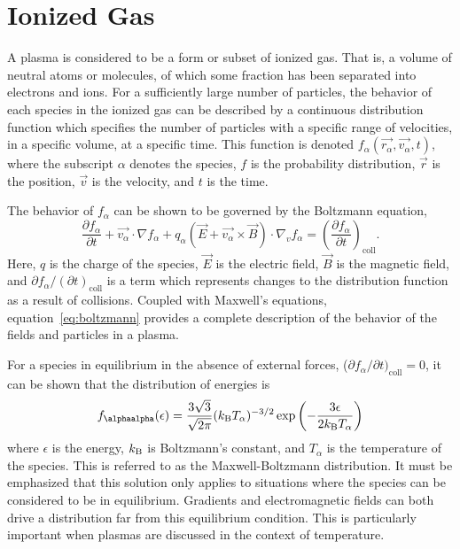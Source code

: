 \section{Ionized Gas}
A plasma is considered to be a form or subset of ionized gas. That is, a volume
of neutral atoms or molecules, of which some fraction has been separated into
electrons and ions. For a sufficiently large number of particles, the behavior
of each species in the ionized gas can be described by a continuous distribution
function which specifies the number of particles with a specific range of
velocities, in a specific volume, at a specific time. This function is denoted
$f_\alpha(\vec{r_\alpha}, \vec{v_\alpha}, t)$, where the subscript $\alpha$
denotes the species, $f$ is the probability distribution, $\vec{r}$ is the
position, $\vec{v}$ is the velocity, and $t$ is the time.

The behavior of $f_\alpha$ can be shown to be governed by the Boltzmann
equation,
\begin{equation}\label{eq:boltzmann}
  \frac{\partial f_\alpha}{\partial t} + \vec{v_\alpha}\cdot\nabla f_\alpha +
  q_\alpha \left(\vec{E} + \vec{v_\alpha}\times\vec{B}\right)
  \cdot \nabla_v f_\alpha = \left( \frac{\partial f_\alpha}
  {\partial t}\right)_\mathrm{coll}.
\end{equation}
Here, $q$ is the charge of the species, $\vec{E}$ is the electric field,
$\vec{B}$ is the magnetic field, and $\partial f_\alpha/(\partial
t)_\mathrm{coll}$ is a term which represents changes to the distribution
function as a result of collisions. Coupled with Maxwell's equations,
equation~\ref{eq:boltzmann} provides a complete description of the behavior of
the fields and particles in a plasma.

For a species in equilibrium in the absence of external forces, ($\partial
f_\alpha/\partial t)_\mathrm{coll} = 0$, it can be shown that the distribution
of energies is
\begin{equation}\label{eq:mb}
  f_{\alphaalpha}(\epsilon) = \frac{3\sqrt{3}}{\sqrt{2\pi}}(\kB T_\alpha)^{-3/2}
                        \exp{\left(-\frac{3\epsilon}{2\kB T_\alpha}\right)}
\end{equation}
where $\epsilon$ is the energy, $k_\mathrm{B}$ is Boltzmann's constant, and $T_\alpha$ is
the temperature of the species. This is referred to as the Maxwell-Boltzmann
distribution. It must be emphasized that this solution only applies to
situations where the species can be considered to be in equilibrium. Gradients
and electromagnetic fields can both drive a distribution far from this
equilibrium condition. This is particularly important when plasmas are discussed
in the context of temperature.

